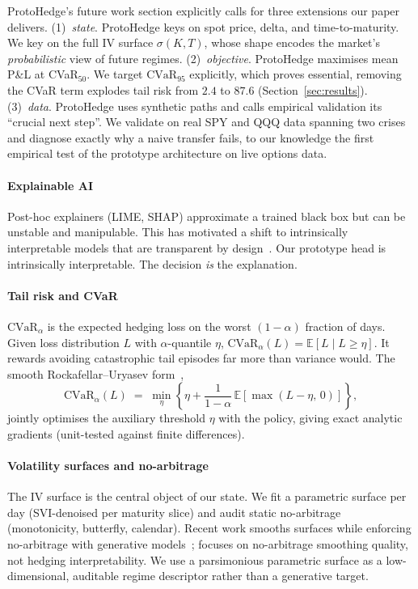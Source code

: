\documentclass[sigconf,anonymous]{acmart}
\begin{document}
ProtoHedge's future work section explicitly calls for three extensions our paper
delivers. (1)~\emph{state}. ProtoHedge keys on spot price, delta, and
time-to-maturity. We key on the full IV surface $\sigma(K,T)$, whose shape encodes
the market's \emph{probabilistic} view of future regimes. (2)~\emph{objective}.
ProtoHedge maximises mean P\&L at CVaR$_{50}$. We target $\mathrm{CVaR}_{95}$
explicitly, which proves essential, removing the CVaR term explodes tail risk from
$2.4$ to $87.6$ (Section~\ref{sec:results}). (3)~\emph{data}. ProtoHedge uses
synthetic paths and calls empirical validation its ``crucial next
step''. We validate on real SPY and QQQ data spanning two crises and diagnose
exactly why a naive transfer fails, to our knowledge the first empirical test
of the prototype architecture on live options data.

\paragraph{Explainable AI} Post-hoc explainers (LIME, SHAP) approximate a
trained black box but can be unstable and manipulable. This has motivated a
shift to intrinsically interpretable models that are transparent by
design~\cite{protohedge2025,chen2019looks}. Our prototype head is intrinsically
interpretable. The decision \emph{is} the explanation.

\paragraph{Tail risk and CVaR} $\mathrm{CVaR}_\alpha$ is the expected hedging
loss on the worst $(1{-}\alpha)$ fraction of days. Given loss distribution $L$
with $\alpha$-quantile $\eta$, $\mathrm{CVaR}_\alpha(L)=\mathbb{E}[L\mid L\ge\eta]$.
It rewards avoiding catastrophic tail episodes far more than variance would.  The
smooth Rockafellar--Uryasev form~\cite{rockafellar2000optimization},
\begin{equation}
  \mathrm{CVaR}_\alpha(L) \;=\; \min_{\eta}\!\left\{
    \eta + \frac{1}{1-\alpha}\,\mathbb{E}[\max(L-\eta,\,0)]
  \right\},
\end{equation}
jointly optimises the auxiliary threshold $\eta$ with the policy, giving exact
analytic gradients (unit-tested against finite differences).

\paragraph{Volatility surfaces and no-arbitrage} The IV surface is the central
object of our state. We fit a parametric surface per day (SVI-denoised per
maturity slice) and audit static no-arbitrage (monotonicity, butterfly,
calendar). Recent work smooths surfaces while enforcing no-arbitrage with
generative models~\cite{vuletic2024volgan,ivsgan2025}; \citet{ivsgan2025} focuses on
no-arbitrage smoothing quality, not hedging interpretability. We use a parsimonious parametric
surface as a low-dimensional, auditable regime descriptor rather than a generative target.
\end{document}
